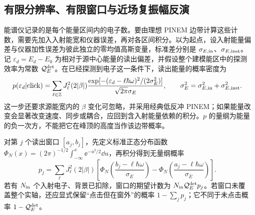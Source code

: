 \subsection{有限分辨率、有限窗口与近场复振幅反演}
\label{sec:electron-detector-inversion-worked}

能谱仪记录的是每个能量区间内的电子数。要由理想 PINEM 边带计算这些计数，需要先加入入射能宽和仪器误差，再对各区间积分。以为起点，设入射能量偏差与仪器加性误差为彼此独立的零均值高斯变量，标准差分别是 $\sigma_{E,\rm in}$、$\sigma_{E,\rm inst}$。记 $\varepsilon_d=E_d-E_0$ 为相对于源中心能量的读出偏差，并假设整个建模能区中的探测效率为常数 $\mathcal Q_E^{\rm det}$。在已经探测到电子这一条件下，读出能量的概率密度为
\begin{equation}
 p(\varepsilon_d|{\rm click})
 =\sum_{\ell\in\mathbb Z}J_\ell^2(2|\beta|)
 \frac{\exp[-(\varepsilon_d-\ell\hbar\omega)^2/(2\sigma_E^2)]}{\sqrt{2\pi}\sigma_E},
 \qquad \sigma_E^2=\sigma_{E,\rm in}^2+\sigma_{E,\rm inst}^2.
 \label{eq:electron-detector-gaussian-comb}
\end{equation}
这一步还要求源能宽内的 $\beta$ 变化可忽略，并采用经典低反冲 PINEM；如果能量改变会显著改变速度、同步或耦合，应回到含入射能量依赖的积分。$p$ 的量纲为能量的负一次方，不能把它在峰顶的高度当作该边带概率。

对第 $j$ 个读出窗口 $[a_j,b_j]$，先定义标准正态分布函数
$\Phi_N(x)=(2\pi)^{-1/2}\int_{-\infty}^x\ee^{-u^2/2}\dd u$，再积分得到无量纲概率
\begin{equation}
 p_j=\sum_\ell J_\ell^2(2|\beta|)
 \left[\Phi_N\!\left(\frac{b_j-\ell\hbar\omega}{\sigma_E}\right)
       -\Phi_N\!\left(\frac{a_j-\ell\hbar\omega}{\sigma_E}\right)\right].
 \label{eq:electron-detector-bin-probabilities}
\end{equation}
若有 $N_{\rm in}$ 个入射电子、背景已扣除，窗口的期望计数为 $N_{\rm in}\mathcal Q_E^{\rm det}p_j$。若窗口未覆盖整个实轴，还应显式保留“点击但在窗外”的概率 $1-\sum_jp_j$；它不同于未点击概率 $1-\mathcal Q_E^{\rm det}$。

